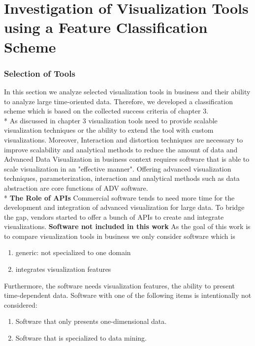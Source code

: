 \chapter{Investigation of Visualization Tools using a Feature Classification Scheme}
\label{chap:Tools}

\subsection{Selection of Tools}
In this section we analyze selected visualization tools in business and their ability to analyze large time-oriented data. Therefore, we developed a classification scheme which is based on the collected success criteria of chapter 3. \\*
As discussed in chapter 3 visualization tools need to provide scalable visualization techniques or the ability to extend the tool with custom visualizations. Moreover, Interaction and distortion techniques are necessary to improve scalability and analytical methods to reduce the amount of data and 
Advanced Data Visualization in business context requires software that is able to scale visualization in an "effective manner"\cite{Russom2011}. Offering advanced visualization techniques, parameterization, interaction and analytical methods such as data abstraction\cite{Tegarden1999,Aigner2011,Eick2002,Zhanga} are core functions of ADV software. \\*
\textbf{The Role of APIs}
Commercial software tends to need more time for the development and integration of advanced visualization for large data\cite{Zhanga, Simon2014}. To bridge the gap, vendors started to offer a bunch of APIs to create and integrate visualizations. 
\textbf{Software not included in this work}
As the goal of this work is to compare visualization tools in business we only consider software which is 
\begin{enumerate}
    \item generic: not specialized to one domain
    \item integrates visualization features
\end{enumerate}

Furthermore, the software needs visualization features, the ability to present time-dependent data. Software with one of the following items is intentionally not considered: 
\begin{enumerate}
    \item Software that only presents one-dimensional data. 
    \item Software that is specialized to data mining.
\end{enumerate}

